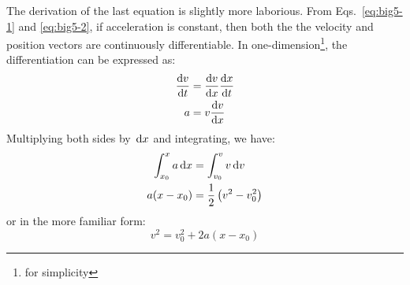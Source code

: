 The derivation of the last equation is slightly more laborious. From
Eqs.~\ref{eq:big5-1} and \ref{eq:big5-2}, if acceleration is constant, then
both the the velocity and position vectors are continuously differentiable. In
one-dimension\footnote{for simplicity}, the differentiation can be expressed as:
\begin{align*}
  \diff vt&=\diff vx\diff xt\\
  a&=v\diff vx
\end{align*}
Multiplying both sides by $\dl x$ and integrating, we have:
\begin{align*}
  \int_{x_0}^x a\dl x&=\int_{v_0}^v v\dl v\\
  a(x-x_0)&=\frac12\left(v^2-v_0^2\right)
\end{align*}
or in the more familiar form:
\begin{equation}
  \boxed{v^2 = v_0^2+ 2a(x-x_0)}
  \label{eq:big5-3}
\end{equation}


%



